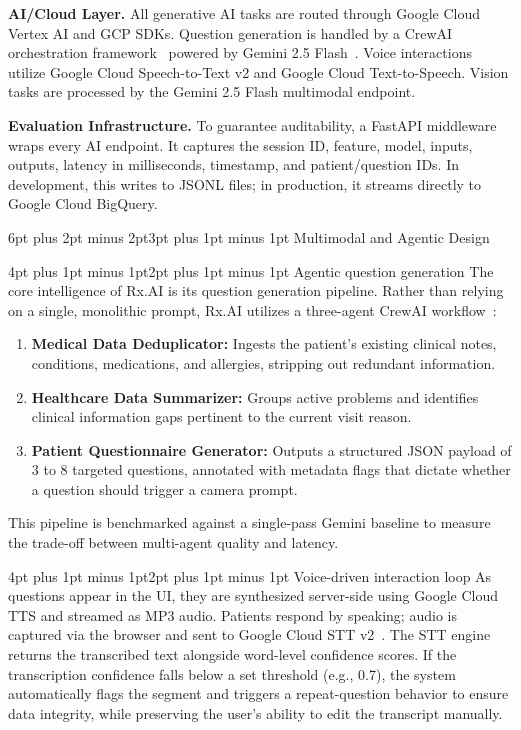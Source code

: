 \documentclass[sigplan,screen]{acmart}
\makeatletter
\renewcommand{\section}{\@startsection{section}{1}{\z@}
  {6pt plus 2pt minus 2pt}{3pt plus 1pt minus 1pt}
  {\normalfont\large\bfseries}}
\renewcommand{\subsection}{\@startsection{subsection}{2}{\z@}
  {4pt plus 1pt minus 1pt}{2pt plus 1pt minus 1pt}
  {\normalfont\normalsize\bfseries}}
\makeatother
\begin{document}
\textbf{AI/Cloud Layer.} All generative AI tasks are routed through Google Cloud Vertex AI and GCP SDKs. Question generation is handled by a CrewAI orchestration framework~\cite{crewai} powered by Gemini 2.5 Flash~\cite{gemini}. Voice interactions utilize Google Cloud Speech-to-Text v2 and Google Cloud Text-to-Speech. Vision tasks are processed by the Gemini 2.5 Flash multimodal endpoint.

\textbf{Evaluation Infrastructure.} To guarantee auditability, a FastAPI middleware wraps every AI endpoint. It captures the session ID, feature, model, inputs, outputs, latency in milliseconds, timestamp, and patient/question IDs. In development, this writes to JSONL files; in production, it streams directly to Google Cloud BigQuery.

\section{Multimodal and Agentic Design}

\subsection{Agentic question generation}
The core intelligence of Rx.AI is its question generation pipeline. Rather than relying on a single, monolithic prompt, Rx.AI utilizes a three-agent CrewAI workflow~\cite{crewai}:
\begin{enumerate}
    \item \textbf{Medical Data Deduplicator:} Ingests the patient's existing clinical notes, conditions, medications, and allergies, stripping out redundant information.
    \item \textbf{Healthcare Data Summarizer:} Groups active problems and identifies clinical information gaps pertinent to the current visit reason.
    \item \textbf{Patient Questionnaire Generator:} Outputs a structured JSON payload of 3 to 8 targeted questions, annotated with metadata flags that dictate whether a question should trigger a camera prompt.
\end{enumerate}
This pipeline is benchmarked against a single-pass Gemini baseline to measure the trade-off between multi-agent quality and latency.

\subsection{Voice-driven interaction loop}
As questions appear in the UI, they are synthesized server-side using Google Cloud TTS and streamed as MP3 audio. Patients respond by speaking; audio is captured via the browser and sent to Google Cloud STT v2~\cite{gcpstt}. The STT engine returns the transcribed text alongside word-level confidence scores. If the transcription confidence falls below a set threshold (e.g., 0.7), the system automatically flags the segment and triggers a repeat-question behavior to ensure data integrity, while preserving the user's ability to edit the transcript manually.
\end{document}
